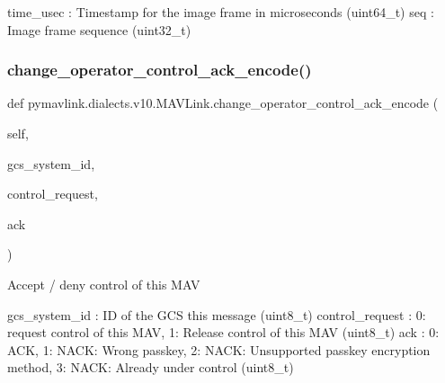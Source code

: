 \begin{DoxyVerb}
\begin{DoxyVerb}
\begin{DoxyVerb}
time_usec                 : Timestamp for the image frame in microseconds (uint64_t)
seq                       : Image frame sequence (uint32_t)\end{DoxyVerb}
 \mbox{\label{classpymavlink_1_1dialects_1_1v10_1_1MAVLink_a4f0c16287a7c463e5afc47379a2d3ca1}} 
\subsubsection{\texorpdfstring{change\+\_\+operator\+\_\+control\+\_\+ack\+\_\+encode()}{change\_operator\_control\_ack\_encode()}}
{\footnotesize\ttfamily def pymavlink.\+dialects.\+v10.\+M\+A\+V\+Link.\+change\+\_\+operator\+\_\+control\+\_\+ack\+\_\+encode (\begin{DoxyParamCaption}\item[{}]{self,  }\item[{}]{gcs\+\_\+system\+\_\+id,  }\item[{}]{control\+\_\+request,  }\item[{}]{ack }\end{DoxyParamCaption})}

\begin{DoxyVerb}Accept / deny control of this MAV

gcs_system_id             : ID of the GCS this message (uint8_t)
control_request           : 0: request control of this MAV, 1: Release control of this MAV (uint8_t)
ack                       : 0: ACK, 1: NACK: Wrong passkey, 2: NACK: Unsupported passkey encryption method, 3: NACK: Already under control (uint8_t)\end{DoxyVerb}
 \mbox{\label{classpymavlink_1_1dialects_1_1v10_1_1MAVLink_af2f8fd2b964c727170e288d9bf970980}} 

\end{DoxyVerb}
\end{DoxyVerb}
